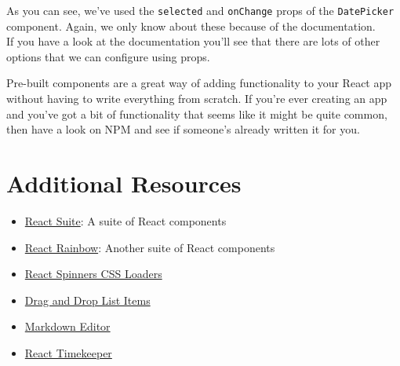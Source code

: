 As you can see, we've used the \texttt{selected} and \texttt{onChange} props of the \texttt{DatePicker} component. Again, we only know about these because of the documentation.
\\

If you have a look at the documentation you'll see that there are lots of other options that we can configure using props.

\hr

Pre-built components are a great way of adding functionality to your React app without having to write everything from scratch. If you're ever creating an app and you've got a bit of functionality that seems like it might be quite common, then have a look on NPM and see if someone's already written it for you.



\section{Additional Resources}

\begin{itemize}[leftmargin=*]
    \item \href{https://rsuitejs.com/en/}{React Suite}: A suite of React components
    \item \href{https://react-rainbow.web.app}{React Rainbow}: Another suite of React components
    \item \href{https://github.com/JoshK2/react-spinners-css}{React Spinners CSS Loaders}
    \item \href{https://github.com/atlassian/react-beautiful-dnd}{Drag and Drop List Items}
    \item \href{https://github.com/uiwjs/react-md-editor}{Markdown Editor}
    \item \href{https://catc.github.io/react-timekeeper/}{React Timekeeper}
\end{itemize}
